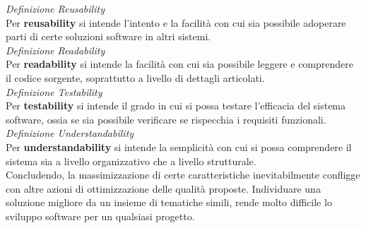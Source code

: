 \documentclass{article}
\begin{document}
\textit{Definizione Reusability}\\
Per \textbf{reusability} si intende l'intento e la facilità con cui sia possibile adoperare parti di certe soluzioni software in altri sistemi.\vspace*{14pt}\\
\textit{Definizione Readability}\\
Per \textbf{readability} si intende la facilità con cui sia possibile leggere e comprendere il codice sorgente, soprattutto a livello di dettagli articolati.\vspace*{14pt}\\
\textit{Definizione Testability}\\
Per \textbf{testability} si intende il grado in cui si possa testare l'efficacia del sistema software, ossia se sia possibile verificare se rispecchia i requisiti funzionali.\vspace*{14pt}\\
\textit{Definizione Understandability}\\
Per \textbf{understandability} si intende la semplicità con cui si possa comprendere il sistema sia a livello organizzativo che a livello strutturale.\vspace*{14pt}\\
Concludendo, la massimizzazione di certe caratteristiche inevitabilmente confligge con altre azioni di ottimizzazione delle qualità proposte. Individuare una soluzione migliore da un insieme di tematiche simili, rende molto difficile lo sviluppo software per un qualsiasi progetto.  
\end{document}
